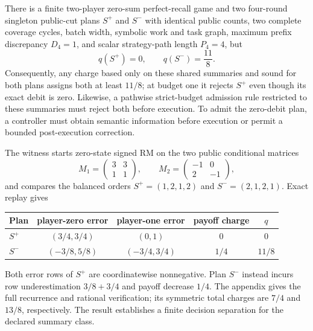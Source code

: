 \begin{proposition}
\label{prop:metadata-separation}
There is a finite two-player zero-sum perfect-recall game and two four-round
singleton public-cut plans $S^+$ and $S^-$ with identical public counts, two
complete coverage cycles, batch width, symbolic work and task graph, maximum
prefix discrepancy $D_4=1$, and scalar strategy-path length $P_4=4$, but
\begin{equation}
q(S^+)=0,\qquad q(S^-)=\frac{11}{8}.
\label{eq:charge-separation}
\end{equation}
Consequently, any charge based only on these shared summaries and sound for
both plans assigns both at least $11/8$; at budget one it rejects $S^+$ even
though its exact debit is zero.  Likewise, a pathwise strict-budget admission
rule restricted to these summaries must reject both before execution.  To
admit the zero-debit plan, a controller must obtain semantic information
before execution or permit a bounded post-execution correction.
\end{proposition}

The witness starts zero-state signed RM on the two public conditional matrices
\[
M_1=\begin{pmatrix}3&3\\1&1\end{pmatrix},\qquad
M_2=\begin{pmatrix}-1&0\\2&-1\end{pmatrix},
\]
and compares the balanced orders $S^+=(1,2,1,2)$ and
$S^-=(2,1,2,1)$.  Exact replay gives
\begin{center}
\small
\begin{tabular}{@{}lcccc@{}}
\toprule
Plan & player-zero error & player-one error & payoff charge & $q$ \\
\midrule
$S^+$ & $(3/4,3/4)$ & $(0,1)$ & $0$ & $0$ \\
$S^-$ & $(-3/8,5/8)$ & $(-3/4,3/4)$ & $1/4$ & $11/8$ \\
\bottomrule
\end{tabular}
\end{center}
Both error rows of $S^+$ are coordinatewise nonnegative.  Plan $S^-$ instead
incurs row underestimation $3/8+3/4$ and payoff decrease $1/4$.  The appendix
gives the full recurrence and rational verification; its symmetric total
charges are $7/4$ and $13/8$, respectively.  The result establishes a finite
decision separation for the declared summary class.
